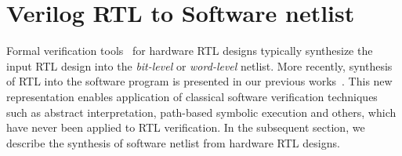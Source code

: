 \section{Verilog RTL to Software netlist}\label{sec:abstraction}
%
Formal verification tools~\cite{abc,DBLP:conf/fmcad/BradleyM07,vis} for 
hardware RTL designs typically synthesize the input RTL design into the
\emph{bit-level} or \emph{word-level} netlist.  
%
%
More recently, synthesis of RTL into the software program is presented 
in our previous works~\cite{mkm2015,mtk2016}.  This new representation 
enables application of classical software verification techniques such as 
abstract interpretation, path-based symbolic execution and others, which 
have never been applied to RTL verification.  In the subsequent section, 
we describe the synthesis of software netlist from hardware RTL designs.     
